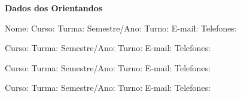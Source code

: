 \documentclass[12pt, a4paper]{article}
\begin{document}
\vspace{1cm}

\begin{center}
  \Large
  \textbf{Dados dos Orientandos}
\end{center}
Nome: \underline{\hspace{14.5cm}}
Curso: \underline{\hspace{14.5cm}}
Turma: \underline{\hspace{3cm}} Semestre/Ano: \underline{\hspace{3cm}} Turno:
\underline{\hspace{3.5cm}}
E-mail: \underline{\hspace{14.5cm}}
Telefones: \underline{\hspace{14cm}}

\vspace{0.5cm}

 \underline{\hspace{14.5cm}}
Curso: \underline{\hspace{14.5cm}}
Turma: \underline{\hspace{3cm}} Semestre/Ano: \underline{\hspace{3cm}} Turno:
\underline{\hspace{3.5cm}}
E-mail: \underline{\hspace{14.5cm}}
Telefones: \underline{\hspace{14cm}}

\vspace{0.5cm}

 \underline{\hspace{14.5cm}}
Curso: \underline{\hspace{14.5cm}}
Turma: \underline{\hspace{3cm}} Semestre/Ano: \underline{\hspace{3cm}} Turno:
\underline{\hspace{3.5cm}}
E-mail: \underline{\hspace{14.5cm}}
Telefones: \underline{\hspace{14cm}}

\vspace{0.5cm}

 \underline{\hspace{14.5cm}}
Curso: \underline{\hspace{14.5cm}}
Turma: \underline{\hspace{3cm}} Semestre/Ano: \underline{\hspace{3cm}} Turno:
\underline{\hspace{3.5cm}}
E-mail: \underline{\hspace{14.5cm}}
Telefones: \underline{\hspace{14cm}}
\end{document}

